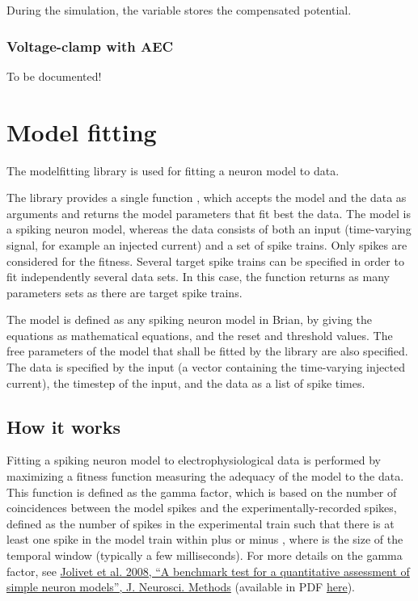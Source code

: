 \documentclass[letterpaper,10pt,english]{manual}
\begin{document}
During the simulation, the variable  stores the compensated
potential.


\subsubsection{Voltage-clamp with AEC}

To be documented!

\resetcurrentobjects
\hypertarget{--doc-modelfitting}{}

\hypertarget{model-fitting-library}{}\section{Model fitting}

The modelfitting library is used for fitting a neuron model to data.

The library provides a single function \hyperlink{brian.library.modelfitting.modelfitting}{}, which accepts the model
and the data as arguments and returns the model parameters that fit best the data.
The model is a spiking neuron model, whereas the data consists of both an input
(time-varying signal, for example an injected current) and a set of spike trains.
Only spikes are considered for the fitness. Several target spike trains can be
specified in order to fit independently several data sets. In this case,
the \hyperlink{brian.library.modelfitting.modelfitting}{} function returns as many parameters sets as there are target spike trains.

The model is defined as any spiking neuron model in Brian, by giving the equations
as mathematical equations, and the reset and threshold values. The free parameters
of the model that shall be fitted by the library are also specified. The data is
specified by the input (a vector containing the time-varying injected current),
the timestep of the input, and the data as a list of spike times.


\subsection{How it works}

Fitting a spiking neuron model to electrophysiological data is performed by maximizing
a fitness function measuring the adequacy of the model to the data.
This function is defined as the gamma factor, which is based on
the number of coincidences between the model spikes and the experimentally-recorded spikes, defined
as the number of spikes in the experimental train such that there is at least one spike
in the model train within plus or minus , where  is the size of the temporal window
(typically a few milliseconds). For more details on the gamma factor, see
\href{http://www.ncbi.nlm.nih.gov/pubmed/18160135}{Jolivet et al. 2008, ``A benchmark test for a quantitative assessment of simple neuron models'', J. Neurosci. Methods} (available in PDF
\href{http://icwww.epfl.ch/~gerstner/PUBLICATIONS/Jolivet08.pdf}{here}).
\end{document}

